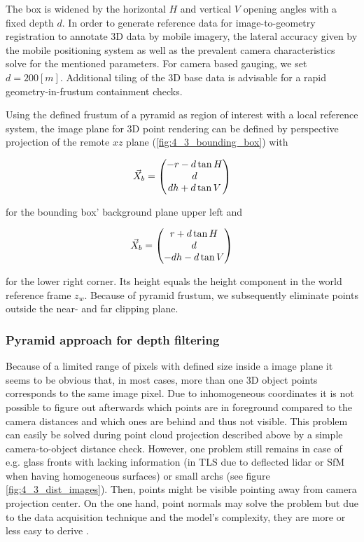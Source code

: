 \documentclass[review]{elsarticle}
\begin{document}
The box is widened by the horizontal $H$ and vertical $V$ opening angles with a fixed depth $d$. In order to generate reference data for image-to-geometry registration to annotate 3D data by mobile imagery, the lateral accuracy given by the mobile positioning system as well as the prevalent camera characteristics solve for the mentioned parameters. For camera based gauging, we set $d=200[m]$. Additional tiling of the 3D base data is advisable for a rapid geometry-in-frustum containment checks.

Using the defined frustum of a pyramid as region of interest with a local reference system, the image plane for 3D point rendering can be defined by perspective projection of the remote $xz$ plane (\ref{fig:4_3_bounding_box}) with 

\begin{equation}
\vec{X}_b = \begin{pmatrix}
-r - d \tan H \\
d \\
dh + d \tan V
\end{pmatrix}
\notag
\end{equation} 

for the bounding box' background plane upper left and 

\begin{equation}
\vec{X}_b =\begin{pmatrix}
r + d \tan H\\
d\\
-dh - d \tan V
\end{pmatrix}
\notag
\end{equation} 

for the lower right corner. Its height equals the height component in the world reference frame $z_w$. Because of pyramid frustum, we subsequently eliminate points outside the near- and far clipping plane.

\subsubsection{Pyramid approach for depth filtering}
Because of a limited range of pixels with defined size inside a image plane it seems to be obvious that, in most cases, more than one 3D object points corresponds to the same image pixel. Due to inhomogeneous coordinates it is not possible to figure out afterwards which points are in foreground compared to the camera distances and which ones are behind and thus not visible. This problem can easily be solved during point cloud projection described above by a simple camera-to-object distance check. However, one problem still remains in case of e.g. glass fronts with lacking information (in \gls{TLS} due to deflected lidar or \gls{SfM} when having homogeneous surfaces) or small archs (see figure \ref{fig:4_3_dist_images}). Then, points might be visible pointing away from camera projection center. On the one hand, point normals may solve the problem but due to the data acquisition technique and the model's complexity, they are more or less easy to derive \cite{Sattler2011}.
\end{document}
